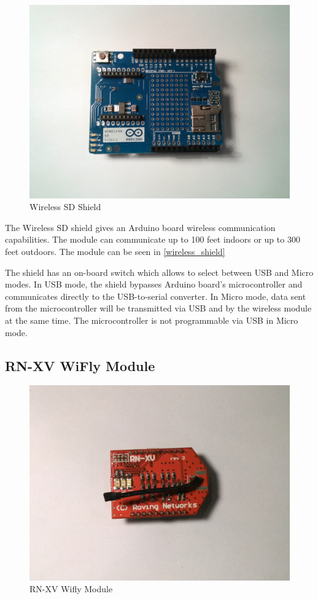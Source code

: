 \begin{figure}[h!]
\centering
\includegraphics[scale=0.53]{2/figures/wireless_shield.pdf}
\caption{Wireless SD Shield}
\label{wireless_shield}
\end{figure}

The Wireless SD shield \cite{arduino_wireless} gives an Arduino board wireless communication capabilities. The module can communicate up to 100 feet indoors or up to 300 feet outdoors. The module can be seen in \autoref{wireless_shield} 

The shield has an on-board switch which allows to select between USB and Micro modes. In USB mode, the shield bypasses Arduino board's microcontroller and communicates directly to the USB-to-serial converter. In Micro mode, data sent from the microcontroller will be transmitted via USB and by the wireless module at the same time. The microcontroller is not programmable via USB in Micro mode.


\subsection{RN-XV WiFly Module}

\begin{figure}[h!]
\centering
\includegraphics[scale=0.53]{2/figures/wifly.pdf}
\caption{RN-XV Wifly Module}
\label{wifly_module}
\end{figure}	

